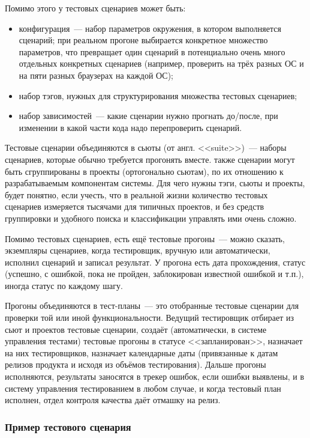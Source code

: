 \documentclass{../../text-style}
\begin{document}
Помимо этого у тестовых сценариев может быть:

\begin{itemize}
    \item конфигурация~--- набор параметров окружения, в котором выполняется сценарий; при реальном прогоне выбирается конкретное множество параметров, что превращает один сценарий в потенциально очень много отдельных конкретных сценариев (например, проверить на трёх разных ОС и на пяти разных браузерах на каждой ОС);
    \item набор тэгов, нужных для структурирования множества тестовых сценариев;
    \item набор зависимостей~--- какие сценарии нужно прогнать до/после, при изменении в какой части кода надо перепроверить сценарий.
\end{itemize}

Тестовые сценарии объединяются в сьюты (от англ. <<suite>>)~--- наборы сценариев, которые обычно требуется прогонять вместе. также сценарии могут быть сгруппированы в проекты (ортогонально сьютам), по их отношению к разрабатываемым компонентам системы. Для чего нужны тэги, сьюты и проекты, будет понятно, если учесть, что в реальной жизни количество тестовых сценариев измеряется тысячами для типичных проектов, и без средств группировки и удобного поиска и классификации управлять ими очень сложно.

Помимо тестовых сценариев, есть ещё тестовые прогоны~--- можно сказать, экземпляры сценариев, когда тестировщик, вручную или автоматически, исполнил сценарий и записал результат. У прогона есть дата прохождения, статус (успешно, с ошибкой, пока не пройден, заблокирован известной ошибкой и т.п.), иногда статус по каждому шагу. 

Прогоны объединяются в тест-планы~--- это отобранные тестовые сценарии для проверки той или иной функциональности. Ведущий тестировщик отбирает из сьют и проектов тестовые сценарии, создаёт (автоматически, в системе управления тестами) тестовые прогоны в статусе <<запланирован>>, назначает на них тестировщиков, назначает календарные даты (привязанные к датам релизов продукта и исходя из объёмов тестирования). Дальше прогоны исполняются, результаты заносятся в трекер ошибок, если ошибки выявлены, и в систему управления тестированием в любом случае, и когда тестовый план исполнен, отдел контроля качества даёт отмашку на релиз.

\subsubsection{Пример тестового сценария}
\end{document}
